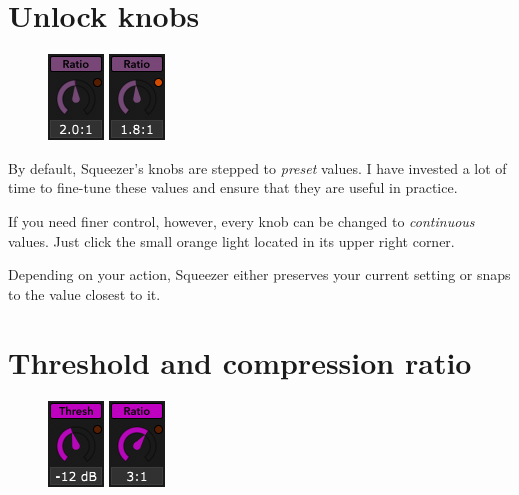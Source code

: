 \section{Unlock knobs}
\label{sec:unlock_knobs}

\begin{figure}
  \includegraphics[scale=\screenshotscale,clip]{include/images/knob_toggle_locked.png}
  \includegraphics[scale=\screenshotscale,clip]{include/images/knob_toggle_unlocked.png}
\end{figure}

By default, Squeezer's knobs are stepped to \emph{preset} values.  I
have invested a lot of time to fine-tune these values and ensure that
they are useful in practice.

If you need finer control, however, every knob can be changed to
\emph{continuous} values.  Just click the small orange light located
in its upper right corner.

Depending on your action, Squeezer either preserves your current
setting or snaps to the value closest to it.

\newpage %

\section{Threshold and compression ratio}

\begin{figure}
  \includegraphics[scale=\screenshotscale,clip]{include/images/knob_threshold.png}
  \includegraphics[scale=\screenshotscale,clip]{include/images/knob_compression_ratio.png}
\end{figure}

